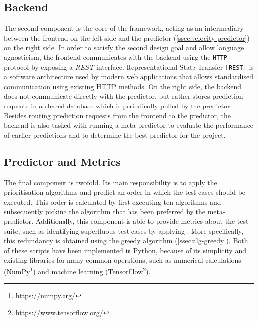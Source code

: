 \subsection{Backend}\label{ssec:velocity-backend}
The second component is the core of the framework, acting as an intermediary between the frontend on the left side and the predictor (\autoref{ssec:velocity-predictor}) on the right side. In order to satisfy the second design goal and allow language agnosticism, the frontend communicates with the backend using the \texttt{HTTP} protocol by exposing a \emph{REST}-interface. Representational State Transfer \texttt{[REST]} is a software architecture used by modern web applications that allows standardised communication using existing HTTP methods. On the right side, the backend does not communicate directly with the predictor, but rather stores prediction requests in a shared database which is periodically polled by the predictor. Besides routing prediction requests from the frontend to the predictor, the backend is also tasked with running a meta-predictor to evaluate the performance of earlier predictions and to determine the best predictor for the project.

\subsection{Predictor and Metrics}\label{ssec:velocity-predictor}
The final component is twofold. Its main responsibility is to apply the prioritisation algorithms and predict an order in which the test cases should be executed. This order is calculated by first executing ten algorithms and subsequently picking the algorithm that has been preferred by the meta-predictor. Additionally, this component is able to provide metrics about the test suite, such as identifying superfluous test cases by applying \tsm{}. More specifically, this redundancy is obtained using the greedy algorithm (\autoref{ssec:alg-greedy}). Both of these scripts have been implemented in Python, because of its simplicity and existing libraries for many common operations, such as numerical calculations (NumPy\footnote{\url{https://numpy.org/}}) and machine learning (TensorFlow\footnote{\url{https://www.tensorflow.org/}}).